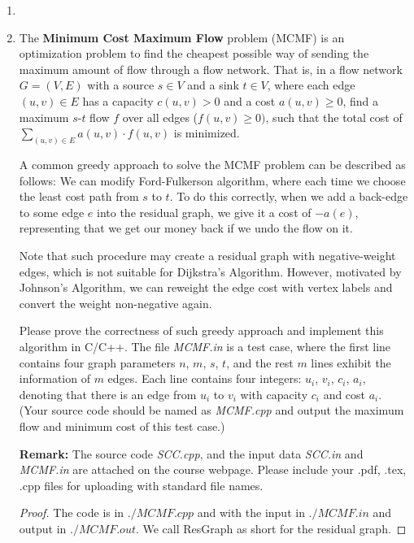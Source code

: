 \documentclass[12pt,a4paper]{article}
\makeatletter
\newtheorem*{solution}{Solution}
\theoremstyle{definition}
\renewenvironment{solution}[1][Solution] {\par\pushQED{\qed}\normalfont\topsep6\p@\@plus6\p@\relax\trivlist\item[\hskip\labelsep\bfseries#1\@addpunct{.}]\ignorespaces}{\popQED\endtrivlist\@endpefalse} \makeatother
\makeatother
\begin{document}
\begin{enumerate}
\begin{solution}
		
	\end{solution}
	\item The \textbf{Minimum Cost Maximum Flow} problem (MCMF) is an optimization problem to find the cheapest possible way of sending the maximum amount of flow through a flow network. That is, in a flow network $G = (V, E)$ with a source $s\in V$ and a sink $t\in V$, where each edge $(u, v)\in E$ has a capacity $c(u,v) > 0$ and a cost $a(u,v) \ge 0$, find a maximum $s\text{-}t$ flow $f$ over all edges ($f(u, v) \ge 0)$, such that the total cost of $\sum_{(u, v) \in E} a(u, v) \cdot f(u, v)$ is minimized.

A common greedy approach to solve the MCMF problem can be described as follows: We can modify Ford-Fulkerson algorithm, where each time we choose the least cost path from $s$ to $t$. To do this correctly, when we add a back-edge to some edge $e$ into the residual graph, we give it a cost of $-a(e)$, representing that we get our money back if we undo the flow on it.

Note that such procedure may create a residual graph with negative-weight edges, which is not suitable for Dijkstra's Algorithm. However, motivated by Johnson's Algorithm, we can reweight the edge cost with vertex labels and convert the weight non-negative again.

Please prove the correctness of such greedy approach and implement this algorithm in C/C++. The file \emph{MCMF.in} is a test case, where the first line contains four graph parameters $n$, $m$, $s$, $t$, and the rest $m$ lines exhibit the information of $m$ edges. Each line contains four integers: $u_i$, $v_i$, $c_i$, $a_i$, denoting that there is an edge from $u_i$ to $v_i$ with capacity $c_i$ and cost $a_i$. {\color{blue}(Your source code should be named as \emph{MCMF.cpp} and output the maximum flow and minimum cost of this test case.)}

\hspace{1cm}
\begin{minipage}[t]{0.45\textwidth}
\textbf{Remark:} The source code \emph{SCC.cpp}, and the input data \emph{SCC.in} and \emph{MCMF.in} are attached on the course webpage. Please include your .pdf, .tex, .cpp files for uploading with standard file names.
\end{minipage}
    \begin{proof}
		 The code is in $./MCMF.cpp$ and with the input in $./MCMF.in$ and output in $./MCMF.out$. We call ResGraph as short for the residual graph. 


\end{proof}
\end{enumerate}
\end{document}
